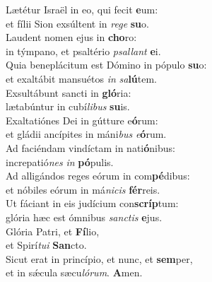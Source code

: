 \evenverse Lætétur Israël in eo, qui fecit \textbf{e}um:~\*\\
\evenverse et fílii Sion exsúltent in \textit{re}\textit{ge} \textbf{su}o.\\
\oddverse Laudent nomen ejus in \textbf{cho}ro:~\*\\
\oddverse in týmpano, et psaltério \textit{psal}\textit{lant} \textbf{e}i.\\
\evenverse Quia beneplácitum est Dómino in pópulo \textbf{su}o:~\*\\
\evenverse et exaltábit mansuétos \textit{in} \textit{sa}\textbf{lú}tem.\\
\oddverse Exsultábunt sancti in \textbf{gló}ria:~\*\\
\oddverse lætabúntur in cubí\textit{li}\textit{bus} \textbf{su}is.\\
\evenverse Exaltatiónes Dei in gútture e\textbf{ó}rum:~\*\\
\evenverse et gládii ancípites in máni\textit{bus} \textit{e}\textbf{ó}rum.\\
\oddverse Ad faciéndam vindíctam in nati\textbf{ó}nibus:~\*\\
\oddverse increpatió\textit{nes} \textit{in} \textbf{pó}pulis.\\
\evenverse Ad alligándos reges eórum in com\textbf{pé}dibus:~\*\\
\evenverse et nóbiles eórum in má\textit{ni}\textit{cis} \textbf{fér}reis.\\
\oddverse Ut fáciant in eis judícium con\textbf{scríp}tum:~\*\\
\oddverse glória hæc est ómnibus \textit{san}\textit{ctis} \textbf{e}jus.\\
\evenverse Glória Patri, et \textbf{Fí}lio,~\*\\
\evenverse et Spirí\textit{tu}\textit{i} \textbf{San}cto.\\
\oddverse Sicut erat in princípio, et nunc, et \textbf{sem}per,~\*\\
\oddverse et in sǽcula sæcu\textit{ló}\textit{rum}. \textbf{A}men.\\
